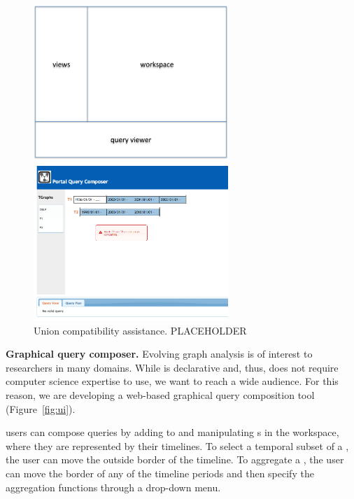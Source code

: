 
\begin{figure}[th!]
\centering
\begin{minipage}{3.2in}
  \includegraphics[width=2.9in]{figs/ui.pdf}
  \caption{Graphical query composition. PLACEHOLDER}
  \label{fig:ui}
\end{minipage}
\begin{minipage}{3.2in}
  \includegraphics[width=2.9in]{figs/uierror.png}
  \caption{Union compatibility assistance. PLACEHOLDER}
  \label{fig:uierror}
\end{minipage}
\end{figure}

{\bf Graphical query composer.} Evolving graph analysis is of interest
to researchers in many domains.  While \ql is declarative and, thus,
does not require computer science expertise to use, we want to reach a
wide audience.  For this reason, we are developing a web-based
graphical query composition tool \qlui (Figure~\ref{fig:ui}).

\qlui users can compose queries by adding to and manipulating \tg{}s
in the workspace, where they are represented by their timelines.  To
select a temporal subset of a \tg, the user can move the outside
border of the timeline.  To aggregate a \tg, the user can move the
border of any of the timeline periods and then specify the aggregation
functions through a drop-down menu.

